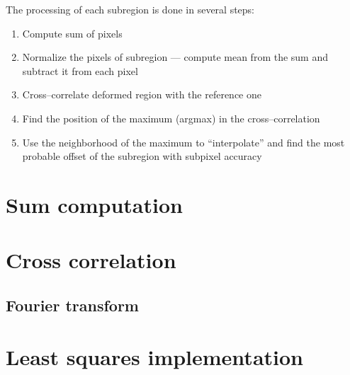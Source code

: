 The processing of each subregion is done in several steps:
\begin{enumerate}
	\item Compute sum of pixels
	\item Normalize the pixels of subregion --- compute mean from the sum and subtract it from each pixel
	\item Cross--correlate deformed region with the reference one
	\item Find the position of the maximum (argmax) in the cross--correlation
	\item Use the neighborhood of the maximum to ``interpolate'' and find the most probable offset of the subregion with subpixel accuracy
\end{enumerate}







\section{Sum computation}
\section{Cross correlation}
\subsection{Fourier transform}
\section{Least squares implementation}